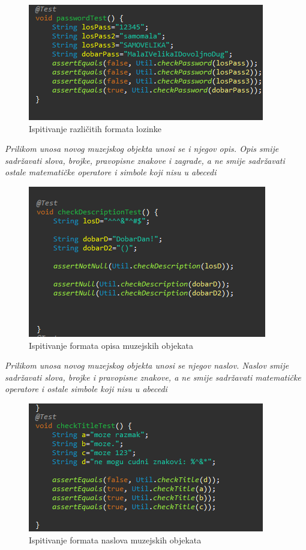			\begin{figure}[H]
				\includegraphics[scale=1]{slike/Junit3.png}
				\centering
				\caption{Ispitivanje različitih formata lozinke}
				\label{fig:promjene}
			\end{figure}
			\newpage
			\textit{Prilikom unosa novog muzejskog objekta unosi se i njegov opis. Opis smije sadržavati slova, brojke, pravopisne znakove i zagrade, a ne smije sadržavati ostale matematičke operatore i simbole koji nisu u abecedi }
			
			\begin{figure}[H]
				\includegraphics[scale=1]{slike/Junit4.png}
				\centering
				\caption{Ispitivanje formata opisa muzejskih objekata}
				\label{fig:promjene}
			\end{figure}
		
			\textit{Prilikom unosa novog muzejskog objekta unosi se njegov naslov. Naslov smije sadržavati slova, brojke i pravopisne znakove, a ne smije sadržavati  matematičke operatore i ostale simbole koji nisu u abecedi }
		
			\begin{figure}[H]
				\includegraphics[scale=1]{slike/Junit5.png}
				\centering
				\caption{Ispitivanje formata naslova muzejskih objekata}
				\label{fig:promjene}
			\end{figure}
		

